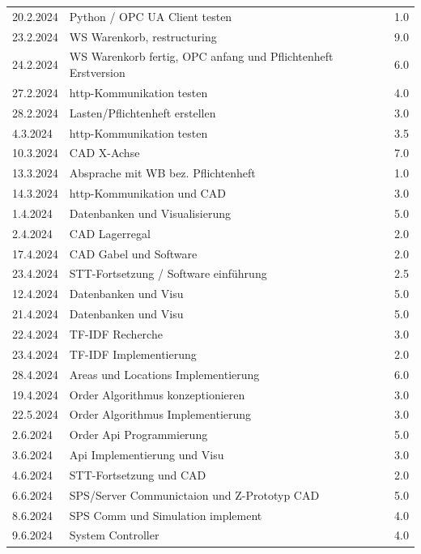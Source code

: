 \begin{longtable}{|l|p{10cm}|r|}
20.2.2024	&Python / OPC UA Client testen	&1.0\\
23.2.2024	&WS Warenkorb, restructuring	&9.0\\
24.2.2024	&WS Warenkorb fertig, OPC anfang und Pflichtenheft Erstversion&	6.0\\
27.2.2024	&http-Kommunikation	testen&4.0\\
28.2.2024	&Lasten/Pflichtenheft erstellen	&3.0\\
4.3.2024	&http-Kommunikation testen&	3.5\\
10.3.2024	&CAD X-Achse& 7.0\\
13.3.2024	&Absprache mit WB bez. Pflichtenheft	&1.0\\
14.3.2024	&http-Kommunikation und CAD&	3.0\\
1.4.2024	&Datenbanken und Visualisierung	&5.0\\
2.4.2024	&CAD Lagerregal&	2.0\\
17.4.2024	&CAD Gabel und Software&	2.0\\
23.4.2024	&STT-Fortsetzung / Software einführung&	2.5\\
12.4.2024	&Datenbanken und Visu	&5.0\\
21.4.2024	&Datenbanken und Visu	&5.0\\
22.4.2024	&TF-IDF Recherche	&3.0\\
23.4.2024	&TF-IDF Implementierung	&2.0\\
28.4.2024	&Areas und Locations Implementierung	&6.0\\
19.4.2024	&Order Algorithmus konzeptionieren	&3.0\\
22.5.2024	&Order Algorithmus Implementierung	&3.0\\
2.6.2024	&Order Api Programmierung	&5.0\\
3.6.2024	&Api Implementierung und Visu& 3.0\\
4.6.2024	&STT-Fortsetzung und CAD&	2.0\\
6.6.2024	&SPS/Server Communictaion und Z-Prototyp CAD	&5.0\\
8.6.2024	&SPS Comm und Simulation implement	&4.0\\
9.6.2024	&System Controller	&4.0\\


\end{longtable}
